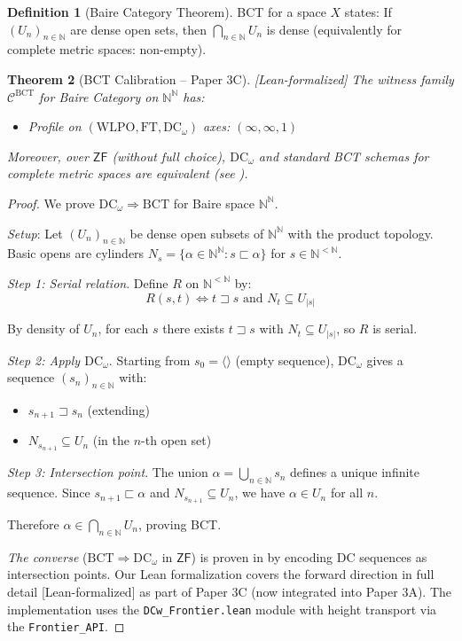 \documentclass[11pt]{article}
\theoremstyle{plain}
\newtheorem{theorem}{Theorem}[section]
\theoremstyle{definition}
\newtheorem{definition}[theorem]{Definition}
\newcommand{\N}{\mathbb{N}}
\newcommand{\WLPO}{\mathrm{WLPO}}
\newcommand{\FT}{\mathrm{FT}}
\newcommand{\DCw}{\mathrm{DC}_\omega}
\newcommand{\BCT}{\mathrm{BCT}}
\newcommand{\ZF}{\mathsf{ZF}}
\newcommand{\leanok}{\textsf{\textcolor{green!70!black}{[Lean-formalized]}}}
\begin{document}
\begin{definition}[Baire Category Theorem]\label{def:bct}
BCT for a space $X$ states: If $(U_n)_{n \in \N}$ are dense open sets, then $\bigcap_{n \in \N} U_n$ is dense (equivalently for complete metric spaces: non-empty).
\end{definition}

\begin{theorem}[BCT Calibration -- Paper 3C]\label{thm:bct-calib} \leanok
The witness family $\mathcal{C}^{\BCT}$ for Baire Category on $\N^\N$ has:
\begin{itemize}
\item Profile on $(\WLPO, \FT, \DCw)$ axes: $(\infty, \infty, 1)$
\end{itemize}
Moreover, over $\ZF$ (without full choice), $\DCw$ and standard BCT schemas for complete metric spaces are equivalent (see \cite{Blair77}).
\end{theorem}

\begin{proof}
We prove $\DCw \Rightarrow \BCT$ for Baire space $\N^\N$.

\emph{Setup}: Let $(U_n)_{n \in \N}$ be dense open subsets of $\N^\N$ with the product topology. Basic opens are cylinders $N_s = \{\alpha \in \N^\N : s \sqsubset \alpha\}$ for $s \in \N^{<\N}$.

\emph{Step 1: Serial relation}. Define $R$ on $\N^{<\N}$ by:
\[
R(s, t) \iff t \sqsupset s \text{ and } N_t \subseteq U_{|s|}
\]

By density of $U_n$, for each $s$ there exists $t \sqsupset s$ with $N_t \subseteq U_{|s|}$, so $R$ is serial.

\emph{Step 2: Apply $\DCw$}. Starting from $s_0 = \langle\rangle$ (empty sequence), $\DCw$ gives a sequence $(s_n)_{n \in \N}$ with:
\begin{itemize}
\item $s_{n+1} \sqsupset s_n$ (extending)
\item $N_{s_{n+1}} \subseteq U_n$ (in the $n$-th open set)
\end{itemize}

\emph{Step 3: Intersection point}. The union $\alpha = \bigcup_{n \in \N} s_n$ defines a unique infinite sequence. Since $s_{n+1} \sqsubset \alpha$ and $N_{s_{n+1}} \subseteq U_n$, we have $\alpha \in U_n$ for all $n$.

Therefore $\alpha \in \bigcap_{n \in \N} U_n$, proving BCT.

\emph{The converse} ($\BCT \Rightarrow \DCw$ in $\ZF$) is proven in \cite{Blair77} by encoding DC sequences as intersection points. Our Lean formalization covers the forward direction in full detail \leanok{} as part of Paper 3C (now integrated into Paper 3A). The implementation uses the \texttt{DCw\_Frontier.lean} module with height transport via the \texttt{Frontier\_API}.
\end{proof}
\end{document}
